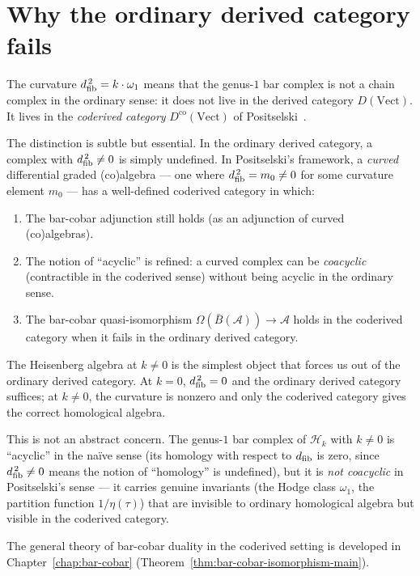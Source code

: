 \section{Why the ordinary derived category fails}
\label{sec:frame-coderived}

The curvature $d_{\mathrm{fib}}^{\,2} = k \cdot \omega_1$ means that the genus-$1$
bar complex is not a chain complex in the ordinary sense: it does
not live in the derived category $D(\mathrm{Vect})$.  It lives in
the \emph{coderived category} $D^{\mathrm{co}}(\mathrm{Vect})$ of
Positselski~\cite{Positselski11}.

The distinction is subtle but essential.  In the ordinary derived
category, a complex with $d_{\mathrm{fib}}^{\,2} \neq 0$ is simply undefined.  In
Positselski's framework, a \emph{curved} differential graded
(co)algebra --- one where $d_{\mathrm{fib}}^{\,2} = m_0 \neq 0$ for some curvature
element $m_0$ --- has a well-defined coderived category in which:
\begin{enumerate}
\item The bar-cobar adjunction still holds (as an adjunction of
  curved (co)algebras).
\item The notion of ``acyclic'' is refined: a curved complex can
  be \emph{coacyclic} (contractible in the coderived sense) without
  being acyclic in the ordinary sense.
\item The bar-cobar quasi-isomorphism
  $\Omega(\bar{B}(\mathcal{A})) \to \mathcal{A}$ holds in the
  coderived category when it fails in the ordinary derived category.
\end{enumerate}

The Heisenberg algebra at $k \neq 0$ is the simplest object that
forces us out of the ordinary derived category.  At $k = 0$,
$d_{\mathrm{fib}}^{\,2} = 0$ and the ordinary derived category suffices; at $k \neq 0$,
the curvature is nonzero and only the coderived category gives the
correct homological algebra.

This is not an abstract concern.  The genus-$1$ bar complex of
$\mathcal{H}_k$ with $k \neq 0$ is ``acyclic'' in the na\"ive sense
(its homology with respect to $d_{\mathrm{fib}}$ is zero, since $d_{\mathrm{fib}}^{\,2} \neq 0$
means the notion of ``homology'' is undefined), but it is
\emph{not coacyclic} in Positselski's sense --- it carries
genuine invariants (the Hodge class $\omega_1$, the partition
function $1/\eta(\tau)$) that are invisible to ordinary
homological algebra but visible in the coderived category.

The general theory of bar-cobar duality in the coderived
setting is developed in
Chapter~\ref{chap:bar-cobar}
(Theorem~\ref{thm:bar-cobar-isomorphism-main}).

